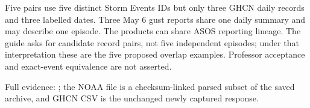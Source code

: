 Five pairs use five distinct Storm Events IDs but only three GHCN daily records and three labelled dates. Three May 6 gust reports share one daily summary and may describe one episode. The products can share ASOS reporting lineage. The guide asks for candidate record pairs, not five independent episodes; under that interpretation these are the five proposed overlap examples. Professor acceptance and exact-event equivalence are not asserted.

Full evidence: ; the NOAA file is a checksum-linked parsed subset of the saved archive, and GHCN CSV is the unchanged newly captured response.

